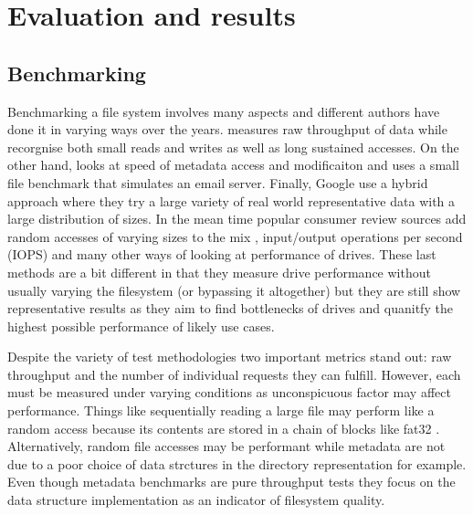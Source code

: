 \chapter{Evaluation and results}

    \section{Benchmarking}
        \label{sec:benchmark}

        Benchmarking a file system involves many aspects and different authors
        have done it in varying ways over the years.  measures
        raw throughput of data while  recorgnise both small
        reads and writes as well as long sustained accesses.  On the other
        hand,  looks at speed of metadata access and
        modificaiton and  uses a small file
        benchmark that simulates an email server. Finally, Google use a hybrid
        approach where they try a large variety of real world representative
        data with a large distribution of sizes. In the mean time popular
        consumer review sources add random accesses of varying sizes to the mix
        \cite{servethehome_review}, input/output operations per second (IOPS)
        \cite{tomshardware_review} and many other ways of looking at
        performance of drives. These last methods are a bit different in that
        they measure drive performance without usually varying the filesystem
        (or bypassing it altogether) but they are still show representative
        results as they aim to find bottlenecks of drives and quanitfy the
        highest possible performance of likely use cases.

        Despite the variety of test methodologies two important metrics stand
        out: raw throughput and the number of individual requests they can
        fulfill. However, each must be measured under varying conditions as
        unconspicuous factor may affect performance. Things like sequentially
        reading a large file may perform like a random access because its
        contents are stored in a chain of blocks like fat32 \cite{fat32}.
        Alternatively, random file accesses may be performant while metadata
        are not due to a poor choice of data strctures in the directory
        representation for example. Even though metadata benchmarks are pure
        throughput tests they focus on the data structure implementation as an
        indicator of filesystem quality.

